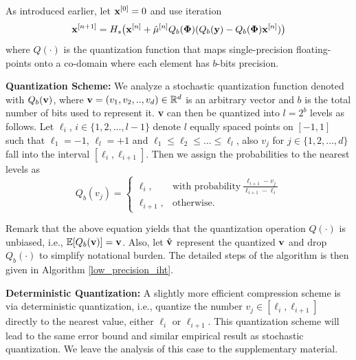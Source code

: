 \documentclass{article}
\begin{document}
As introduced earlier, let ${\bf x}^{[0]} = 0$ and use iteration
\begin{equation} \label{modified_update_rule}
  {\bf x}^{[n+1]} = H_s\big({\bf x}^{[n]}+\hat{\mu}^{[n]} Q_b(\boldsymbol{\Phi})(Q_b({\bf y})-Q_b(\boldsymbol{\Phi}){\bf x}^{[n]})\big)  
\end{equation}
where $Q(\cdot)$ is the quantization function that maps single-precision floating-points onto a co-domain where each element has $b$-bits precision.

{\bf Quantization Scheme:} We analyze a stochastic quantization function denoted with $Q_b({\bf v})$, where ${\bf v}=(v_1, v_2, .., v_d) \in \mathbb{R}^d$ is an arbitrary vector and $b$ is the total number of bits used to represent it. {\bf v} can then be quantized into $l=2^b$ levels as follows. Let $\ell_i$, $i\in \{1, 2, ..., l-1 \}$ denote $l$ equally spaced points on $[-1, 1]$ such that $\ell_1= -1$, $\ell_l= +1$ and $\ell_1\leq\ell_2 \leq ... \leq \ell_l$, also $v_j$ for $j\in \{1, 2, ..., d \}$ fall into the interval $[\ell_i, \ell_{i+1}]$. Then we assign the probabilities to the nearest levels as
\[
    Q_b(v_j) = \left\{\begin{array}{lr}
        \ell_i, & \textrm{with probability} \ \frac{\ell_{i+1}-v_j}{\ell_{i+1}-\ell_i}\\
        \ell_{i+1},&\textrm{otherwise}.  \ \ \ \  \ \ \ \ \ \ \ \ \ \ \ \ \ \ 
        \end{array}
\]
  
Remark that the above equation yields that the quantization operation $Q(\cdot)$ is unbiased, i.e., $\mathbb{E}[Q_b({\bf v})] = {\bf v}$. Also, let $\hat{{\bf v}}$ represent the quantized ${\bf v}$ and drop $Q_b(\cdot)$ to simplify notational burden. The detailed steps of the algorithm is then given in Algorithm \ref{low_precision_iht}.

{\bf Deterministic Quantization:} A slightly more efficient compression scheme is via deterministic quantization, i.e., quantize the number
$v_j \in [\ell_i, \ell_{i+1}]$ directly to the nearest
value, either $\ell_i$ or $\ell_{i+1}$. 
This quantization scheme will lead to the same 
error bound and similar empirical result as stochastic quantization. {We leave the analysis
of this case to the supplementary material.}
\end{document}
